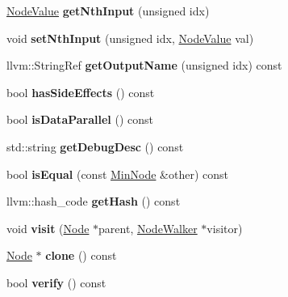 \begin{DoxyCompactItemize}
\hyperlink{structglow_1_1_node_value}{Node\+Value} {\bfseries get\+Nth\+Input} (unsigned idx)
\item 
\mbox{\label{classglow_1_1_min_node_a55bd225714e473d73d8f4776a68e172c}} 
void {\bfseries set\+Nth\+Input} (unsigned idx, \hyperlink{structglow_1_1_node_value}{Node\+Value} val)
\item 
\mbox{\label{classglow_1_1_min_node_aa5069f3beb3b7d0f250e930c523ecb6e}} 
llvm\+::\+String\+Ref {\bfseries get\+Output\+Name} (unsigned idx) const
\item 
\mbox{\label{classglow_1_1_min_node_af7e522475de137e64d3b0bcf95b67c35}} 
bool {\bfseries has\+Side\+Effects} () const
\item 
\mbox{\label{classglow_1_1_min_node_ab415be8fd202ab8b936c03fb044d7ecc}} 
bool {\bfseries is\+Data\+Parallel} () const
\item 
\mbox{\label{classglow_1_1_min_node_ae752d3f4b96c2de7d297ed48846f5a15}} 
std\+::string {\bfseries get\+Debug\+Desc} () const
\item 
\mbox{\label{classglow_1_1_min_node_a49d74cdac1a52a9a6641dcb171a18fe4}} 
bool {\bfseries is\+Equal} (const \hyperlink{classglow_1_1_min_node}{Min\+Node} \&other) const
\item 
\mbox{\label{classglow_1_1_min_node_ae112ee2dd8d27036700d38bde87ba0a3}} 
llvm\+::hash\+\_\+code {\bfseries get\+Hash} () const
\item 
\mbox{\label{classglow_1_1_min_node_afd92781b90e26811ab932dfb359d6ef0}} 
void {\bfseries visit} (\hyperlink{classglow_1_1_node}{Node} $\ast$parent, \hyperlink{classglow_1_1_node_walker}{Node\+Walker} $\ast$visitor)
\item 
\mbox{\label{classglow_1_1_min_node_ac579ad53985df70906ce8158aa63a56a}} 
\hyperlink{classglow_1_1_node}{Node} $\ast$ {\bfseries clone} () const
\item 
\mbox{\label{classglow_1_1_min_node_a0651a0b28c2e7bf762c1b6bbe934ce29}} 
bool {\bfseries verify} () const
\end{DoxyCompactItemize}
